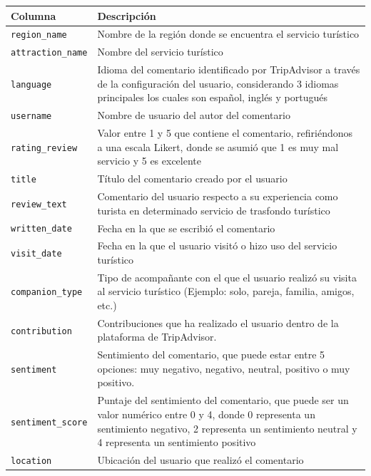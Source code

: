 \begin{table}[htbp]
\begin{tabularx}{\textwidth}{|l|X|}
\hline
\textbf{Columna} & \textbf{Descripción} \\ \hline
\texttt{region\_name} &  Nombre de la región donde se encuentra el servicio turístico \\ \hline
\texttt{attraction\_name} &  Nombre del servicio turístico \\ \hline
\texttt{language} &  Idioma del comentario identificado por TripAdvisor a través de la configuración del usuario, considerando 3 idiomas principales los cuales son español, inglés y portugués \\ \hline
\texttt{username} &  Nombre de usuario del autor del comentario \\ \hline
\texttt{rating\_review} & Valor entre 1 y 5 que contiene el comentario, refiriéndonos a una escala Likert, donde se asumió que 1 es muy mal servicio y 5 es excelente \\ \hline
\texttt{title} & Título del comentario creado por el usuario \\ \hline
\texttt{review\_text} & Comentario del usuario respecto a su experiencia como turista en determinado servicio de trasfondo turístico \\ \hline
\texttt{written\_date} & Fecha en la que se escribió el comentario \\ \hline
\texttt{visit\_date} & Fecha en la que el usuario visitó o hizo uso del servicio turístico \\ \hline
\texttt{companion\_type} & Tipo de acompañante con el que el usuario realizó su visita al servicio turístico (Ejemplo: solo, pareja, familia, amigos, etc.) \\ \hline
\texttt{contribution} & Contribuciones que ha realizado el usuario dentro de la plataforma de TripAdvisor. \\ \hline
\texttt{sentiment} & Sentimiento del comentario, que puede estar entre 5 opciones: muy negativo, negativo, neutral, positivo o muy positivo. \\ \hline
\texttt{sentiment\_score} & Puntaje del sentimiento del comentario, que puede ser un valor numérico entre 0 y 4, donde 0 representa un sentimiento negativo, 2 representa un sentimiento neutral y 4 representa un sentimiento positivo \\ \hline
\texttt{location} & Ubicación del usuario que realizó el comentario \\ \hline
\end{tabularx}
\end{table}


